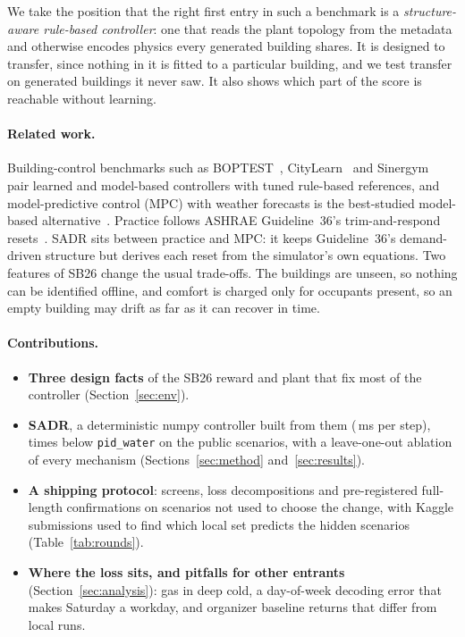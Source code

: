 \documentclass{article}
\begin{document}
We take the position that the right first entry in such a benchmark is a \emph{structure-aware rule-based controller}: one that reads the plant topology from the metadata and otherwise encodes physics every generated building shares. It is designed to transfer, since nothing in it is fitted to a particular building, and we test transfer on generated buildings it never saw. It also shows which part of the score is reachable without learning.

\paragraph{Related work.} Building-control benchmarks such as BOPTEST~\citep{blum2021boptest}, CityLearn~\citep{vazquezcanteli2019citylearn} and Sinergym~\citep{jimenezraboso2021sinergym} pair learned and model-based controllers with tuned rule-based references, and model-predictive control (MPC) with weather forecasts is the best-studied model-based alternative~\citep{oldewurtel2012mpc,drgona2020mpc}. Practice follows ASHRAE Guideline~36's trim-and-respond resets~\citep{ashrae2021g36,taylor2018vav}. SADR sits between practice and MPC: it keeps Guideline~36's demand-driven structure but derives each reset from the simulator's own equations. Two features of SB26 change the usual trade-offs. The buildings are unseen, so nothing can be identified offline, and comfort is charged only for occupants present, so an empty building may drift as far as it can recover in time.

\paragraph{Contributions.}
\begin{itemize}
\item \textbf{Three design facts} of the SB26 reward and plant that fix most of the controller (Section~\ref{sec:env}).
\item \textbf{SADR}, a deterministic numpy controller built from them (\PolicyMsOurs{}\,ms per step), \RElvPwTimes{} times below \texttt{pid\_water} on the public scenarios, with a leave-one-out ablation of every mechanism (Sections~\ref{sec:method} and~\ref{sec:results}).
\item \textbf{A shipping protocol}: screens, loss decompositions and pre-registered full-length confirmations on scenarios not used to choose the change, with Kaggle submissions used to find which local set predicts the hidden scenarios (Table~\ref{tab:rounds}).
\item \textbf{Where the loss sits, and pitfalls for other entrants} (Section~\ref{sec:analysis}): gas in deep cold, a day-of-week decoding error that makes Saturday a workday, and organizer baseline returns that differ from local runs.
\end{itemize}
\end{document}
